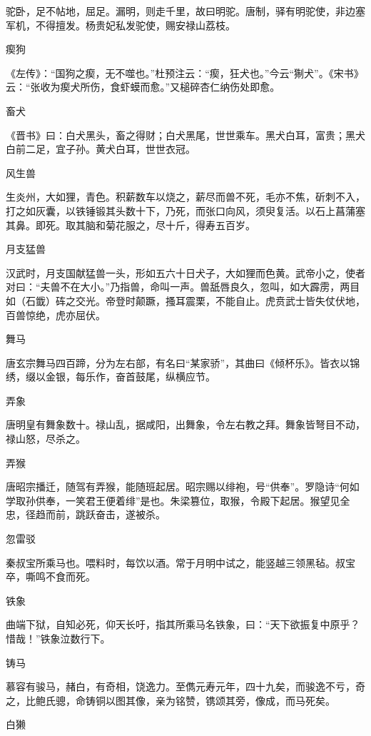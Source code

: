 \documentclass[a4paper,12pt,UTF8,twoside]{ctexbook}
\begin{document}
    驼卧，足不帖地，屈足。漏明，则走千里，故曰明驼。唐制，驿有明驼使，非边塞军机，不得擅发。杨贵妃私发驼使，赐安禄山荔枝。
    
    瘈狗
    
    《左传》：“国狗之瘈，无不噬也。”杜预注云：“瘈，狂犬也。”今云“猘犬”。《宋书》云：“张收为瘈犬所伤，食虾蟆而愈。”又槌碎杏仁纳伤处即愈。
    
    畜犬
    
    《晋书》曰：白犬黑头，畜之得财；白犬黑尾，世世乘车。黑犬白耳，富贵；黑犬白前二足，宜子孙。黄犬白耳，世世衣冠。
    
    风生兽
    
    生炎州，大如狸，青色。积薪数车以烧之，薪尽而兽不死，毛亦不焦，斫刺不入，打之如灰囊，以铁锤锻其头数十下，乃死，而张口向风，须臾复活。以石上菖蒲塞其鼻。即死。取其脑和菊花服之，尽十斤，得寿五百岁。
    
    月支猛兽
    
    汉武时，月支国献猛兽一头，形如五六十日犬子，大如狸而色黄。武帝小之，使者对曰：“夫兽不在大小。”乃指兽，命叫一声。兽舐唇良久，忽叫，如大霹雳，两目如（石韱）砗之交光。帝登时颠蹶，搔耳震栗，不能自止。虎贲武士皆失仗伏地，百兽惊绝，虎亦屈伏。
    
    舞马
    
    唐玄宗舞马四百蹄，分为左右部，有名曰“某家骄”，其曲曰《倾杯乐》。皆衣以锦绣，缀以金银，每乐作，奋首鼓尾，纵横应节。
    
    弄象
    
    唐明皇有舞象数十。禄山乱，据咸阳，出舞象，令左右教之拜。舞象皆弩目不动，禄山怒，尽杀之。
    
    弄猴
    
    唐昭宗播迁，随驾有弄猴，能随班起居。昭宗赐以绯袍，号“供奉”。罗隐诗“何如学取孙供奉，一笑君王便着绯”是也。朱梁篡位，取猴，令殿下起居。猴望见全忠，径趋而前，跳跃奋击，遂被杀。
    
    忽雷驳
    
    秦叔宝所乘马也。喂料时，每饮以酒。常于月明中试之，能竖越三领黑毡。叔宝卒，嘶鸣不食而死。
    
    铁象
    
    曲端下狱，自知必死，仰天长吁，指其所乘马名铁象，曰：“天下欲振复中原乎？惜哉！”铁象泣数行下。
    
    铸马
    
    慕容有骏马，赭白，有奇相，饶逸力。至儁元寿元年，四十九矣，而骏逸不亏，奇之，比鲍氏骢，命铸铜以图其像，亲为铭赞，镌颂其旁，像成，而马死矣。
    
    白獭
    
\end{document}
